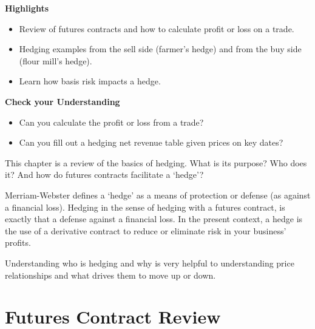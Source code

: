 \documentclass[
]{book}
\providecommand{\tightlist}{%
  \setlength{\itemsep}{0pt}\setlength{\parskip}{0pt}}
\begin{document}
\textbf{Highlights}

\begin{itemize}
\tightlist
\item
  Review of futures contracts and how to calculate profit or loss on a trade.
\item
  Hedging examples from the sell side (farmer's hedge) and from the buy side (flour mill's hedge).
\item
  Learn how basis risk impacts a hedge.
\end{itemize}

\textbf{Check your Understanding}

\begin{itemize}
\tightlist
\item
  Can you calculate the profit or loss from a trade?
\item
  Can you fill out a hedging net revenue table given prices on key dates?
\end{itemize}

This chapter is a review of the basics of hedging. What is its purpose? Who does it? And how do futures contracts facilitate a `hedge'?

Merriam-Webster defines a `hedge' as a means of protection or defense (as against a financial loss). Hedging in the sense of hedging with a futures contract, is exactly that a defense against a financial loss. In the present context, a hedge is the use of a derivative contract to reduce or eliminate risk in your business' profits.

Understanding who is hedging and why is very helpful to understanding price relationships and what drives them to move up or down.

\hypertarget{futures-contract-review}{%
\section{Futures Contract Review}\label{futures-contract-review}}
\end{document}
